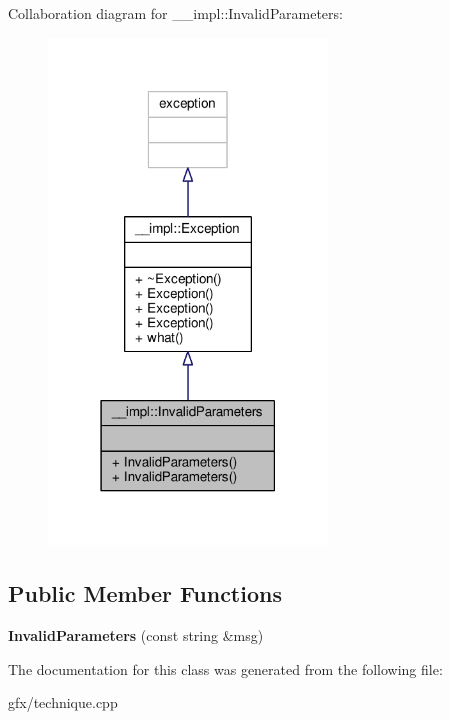Collaboration diagram for \+\_\+\+\_\+impl\+:\+:Invalid\+Parameters\+:
\nopagebreak
\begin{figure}[H]
\begin{center}
\leavevmode
\includegraphics[width=210pt]{d8/d75/class____impl_1_1InvalidParameters__coll__graph}
\end{center}
\end{figure}
\subsection*{Public Member Functions}
\begin{DoxyCompactItemize}
\item 
{\bfseries Invalid\+Parameters} (const string \&msg)\hypertarget{class____impl_1_1InvalidParameters_a18b0f3a9d885ed8c464f4d63fa290517}{}\label{class____impl_1_1InvalidParameters_a18b0f3a9d885ed8c464f4d63fa290517}

\end{DoxyCompactItemize}


The documentation for this class was generated from the following file\+:\begin{DoxyCompactItemize}
\item 
gfx/technique.\+cpp\end{DoxyCompactItemize}
